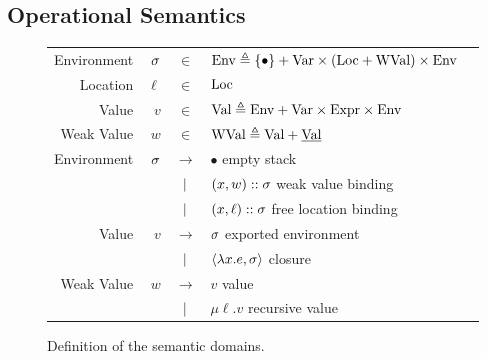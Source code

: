 \subsection{Operational Semantics}
\begin{figure}[h!]
  \centering
  \small
  \begin{tabular}{rrcll}
    Environment & $\sigma$ & $\in$         & $\text{Env}\triangleq\{\bullet\}+\text{Var}\times(\text{Loc}+\text{WVal})\times\text{Env}$  \\
    Location    & $\ell$ & $\in$         & $\text{Loc}$                                                             \\
    Value       & $v$    & $\in$         & $\text{Val} \triangleq\text{Env}+\text{Var}\times\text{Expr}\times\text{Env}$              \\
    Weak Value  & $w$    & $\in$         & $\text{WVal}\triangleq\text{Val}+\underline{\text{Val}}$                          \\
    Environment & $\sigma$ & $\rightarrow$ & $\bullet$                             \hfill empty stack           \\
                &        & $|$       & $(x,w):: \sigma$                     \hfill weak value binding    \\
                &        & $|$       & $(x,\ell)::\sigma$                   \hfill free location binding \\
    Value       & $v$    & $\rightarrow$ & $\sigma$                                \hfill exported environment  \\
                &        & $|$       & $\langle \lambda x.e, \sigma \rangle$   \hfill closure               \\
    Weak Value  & $w$    & $\rightarrow$ & $v$                                   \hfill value                 \\
                &        & $|$       & $\mu\ell.v$                           \hfill recursive value
  \end{tabular}
  \caption{Definition of the semantic domains.}
  \label{fig:domain}
\end{figure}

